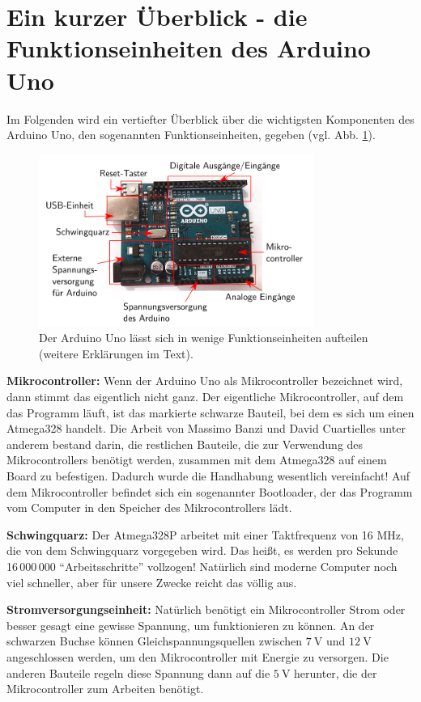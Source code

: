\section{Ein kurzer Überblick - die Funktionseinheiten des Arduino Uno}
\label{sec:ueberblick}
Im Folgenden wird ein vertiefter Überblick über die wichtigsten Komponenten des Arduino Uno, den sogenannten Funktionseinheiten, gegeben (vgl. Abb. \ref{abb:uno_r3}).

\begin{figure}[h]
	\centering
	\includegraphics[width=0.8\textwidth]{pics/arduino-beschriftet.png}
	\caption{Der Arduino Uno lässt sich in wenige Funktionseinheiten aufteilen (weitere Erklärungen im Text).}
	\label{abb:uno_r3}
\end{figure}

\textbf{Mikrocontroller:} Wenn der Arduino Uno als Mikrocontroller bezeichnet wird, dann stimmt das eigentlich nicht ganz. Der eigentliche Mikrocontroller, auf dem das Programm läuft, ist das markierte schwarze Bauteil, bei dem es sich um einen Atmega328 handelt. Die Arbeit von Massimo Banzi und David Cuartielles unter anderem bestand darin, die restlichen Bauteile, die zur Verwendung des Mikrocontrollers benötigt werden, zusammen mit dem Atmega328 auf einem Board zu befestigen. Dadurch wurde die Handhabung wesentlich vereinfacht! Auf dem Mikrocontroller befindet sich ein sogenannter Bootloader, der das Programm vom Computer in den Speicher des Mikrocontrollers lädt.

\textbf{Schwingquarz:} Der Atmega328P arbeitet mit einer Taktfrequenz von 16 MHz, die von dem Schwingquarz vorgegeben wird. Das heißt, es werden pro Sekunde 16\,000\,000 \enquote{Arbeitsschritte} vollzogen! Natürlich sind moderne Computer noch viel schneller, aber für unsere Zwecke reicht das völlig aus.

\textbf{Stromversorgungseinheit:} Natürlich benötigt ein Mikrocontroller Strom oder besser gesagt eine gewisse Spannung, um funktionieren zu können. An der schwarzen Buchse können Gleichspannungsquellen zwischen $\SI{7}{\volt}$ und $\SI{12}{\volt}$ angeschlossen werden, um den Mikrocontroller mit Energie zu versorgen. Die anderen Bauteile regeln diese Spannung dann auf die $\SI{5}{\volt}$ herunter, die der Mikrocontroller zum Arbeiten benötigt.

